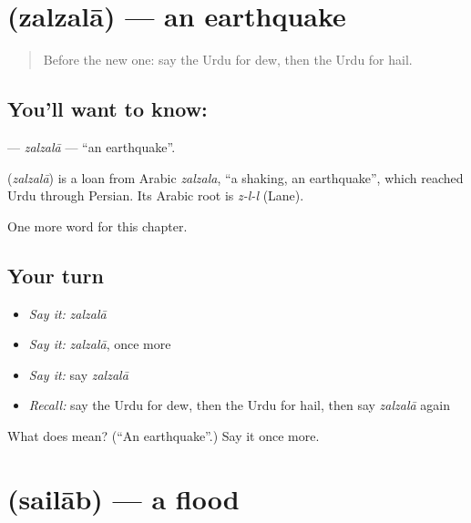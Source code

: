 \section[\texorpdfstring{\ur{زلزلہ} (zalzalā)}{زلزلہ (zalzalā)}]{ (zalzalā) — an earthquake}

\label{lesson:UR-C233-zalzala}



\begin{quote}
Before the new one: say the Urdu for dew, then the Urdu for hail.
\end{quote}

\subsection*{You'll want to know: }
\textbf{} — \emph{zalzalā} — \textquotedblleft{}an earthquake\textquotedblright{}.

\begin{cousinweb}
\textbf{} (\emph{zalzalā}) is a loan from Arabic \emph{zalzala}, \textquotedblleft{}a shaking, an earthquake\textquotedblright{}, which reached Urdu through Persian. Its Arabic root is \emph{z-l-l} (Lane).
\end{cousinweb}

\begin{grammarlens}[title={What you've built}]
One more word for this chapter.
\end{grammarlens}

\subsection*{Your turn}
\begin{itemize}
\raggedright
  \item \emph{Say it:} \emph{zalzalā}
  \item \emph{Say it:} \emph{zalzalā}, once more
  \item \emph{Say it:} say \emph{zalzalā}
  \item \emph{Recall:} say the Urdu for dew, then the Urdu for hail, then say \emph{zalzalā} again
\end{itemize}

\begin{tcolorbox}[breakable,colback=teal!4,colframe=teal!35!black,title={Before you move on}]
What does  mean? (\textquotedblleft{}An earthquake\textquotedblright{}.) Say it once more.
\end{tcolorbox}
\section[\texorpdfstring{\ur{سیلاب} (sailāb)}{سیلاب (sailāb)}]{ (sailāb) — a flood}

